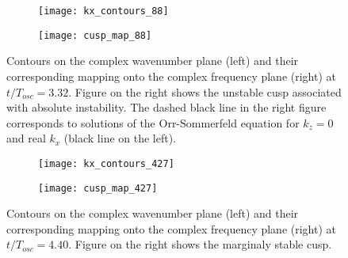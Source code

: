\begin{figure}
	\centering
	\begin{subfigure}[t]{0.48\textwidth}
		\centering
		\texttt{[image: kx\_contours\_88]}
	\end{subfigure}
	\begin{subfigure}[t]{0.48\textwidth}
		\centering
		\texttt{[image: cusp\_map\_88]}
	\end{subfigure}
	\caption{Contours on the complex wavenumber plane (left) and their corresponding mapping onto the complex frequency plane (right) at $t/T_{osc}=3.32$. Figure on the right shows the unstable cusp associated with absolute instability. The dashed black line in the right figure corresponds to solutions of the Orr-Sommerfeld equation for $k_{z}=0$ and real $k_{x}$ (black line on the left).}
	\label{fig:bubble_cusp_88}
\end{figure}

\begin{figure}
	\centering
	\begin{subfigure}[t]{0.48\textwidth}
		\centering
		\texttt{[image: kx\_contours\_427]}
	\end{subfigure}
	\begin{subfigure}[t]{0.48\textwidth}
		\centering
		\texttt{[image: cusp\_map\_427]}
	\end{subfigure}
	\caption{Contours on the complex wavenumber plane (left) and their corresponding mapping onto the complex frequency plane (right) at $t/T_{osc}=4.40$. Figure on the right shows the marginaly stable cusp.}
	\label{fig:bubble_cusp_427}
\end{figure}

